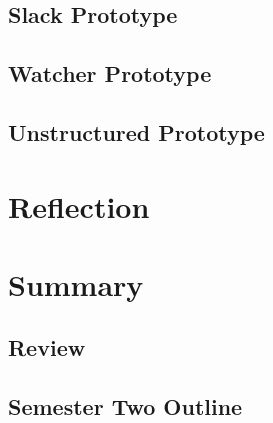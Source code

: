 \documentclass{article}
\begin{document}
\subsection{Slack Prototype}

\subsection{Watcher Prototype}

\subsection{Unstructured Prototype} \label{unstructured-poc}

\section{Reflection}



\section{Summary}



\subsection{Review}



\subsection{Semester Two Outline}


\end{document}
